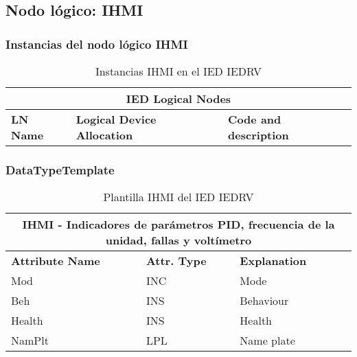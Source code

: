 
\subsection{Nodo l\'ogico: 			 IHMI}

    \subsubsection{Instancias del nodo l\'ogico IHMI}
    \begin{table}[H]
    \begin{center}
    \begin{tabular}{|l|l|p{6.8cm}|}
            \hline
            \multicolumn{3}{|c|}{\cellcolor[gray]{0.8} \textbf{IED Logical Nodes} } \\
            \hline
            \textbf{LN Name} & \textbf{Logical Device Allocation} & \textbf{Code and description} \\
            \hline
    \end{tabular}
    \caption{Instancias IHMI en el IED IEDRV}
    \label{table:lnInstIHMI_reg}
    \end{center}
    \end{table}
    
    
    
    \subsubsection{DataTypeTemplate}
    \begin{table}[H]
    \begin{center}
    \begin{tabular}{|l|l|p{8.5cm}|}
            \hline
            \multicolumn{3}{|c|}{\cellcolor[gray]{0.8} \textbf{ IHMI}  - Indicadores de par\'ametros PID, frecuencia de la unidad, fallas y volt\'imetro} \\
            \hline
            \textbf{Attribute Name} & \textbf{Attr. Type} & \textbf{Explanation} \\
            \hline 
            Mod & INC & Mode \\
            \hline
            Beh & INS & Behaviour \\
            \hline
            Health & INS & Health \\
            \hline
            NamPlt & LPL & Name plate \\
            \hline
    \end{tabular}
    \caption{Plantilla IHMI del IED IEDRV}
    \label{table:lnTypeIHMI_reg}
    \end{center}
    \end{table}
    
    
    